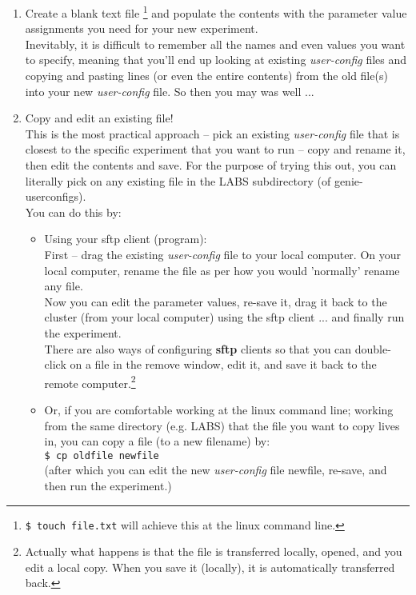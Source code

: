\begin{enumerate}[noitemsep]

\vspace{1mm}
\item Create a blank text file \footnote{\texttt{\$ touch file.txt} will achieve this at the linux command line.} and populate the contents with the parameter value assignments you need for your new experiment.
\\Inevitably, it is difficult to remember all the names and even values you want to specify, meaning that you'll end up looking at existing \textit{user-config} files and copying and pasting lines (or even the entire contents) from the old file(s) into your new \textit{user-config} file. So then you may was well ...

\vspace{1mm}
\item Copy and edit an existing file!
\\This is the most practical approach -- pick an existing \textit{user-config} file that is closest to the specific experiment that you want to run -- copy and rename it, then edit the contents and save. For the purpose of trying this out, you can literally pick on any existing file in the \textsf{\footnotesize LABS } subdirectory (of \textsf{\footnotesize genie-userconfigs}).
\vspace{1mm}
\\ You can do this by:
\begin{itemize}[noitemsep]
\vspace{1mm}
\item Using your sftp client (program):
\\First -- drag the existing \textit{user-config} file to your local computer. On your local computer, rename the file as per how you would 'normally' rename any file. 
\\Now you can edit the parameter values, re-save it, drag it back to the cluster (from your local computer) using the sftp client ... and finally run the experiment.
\\There are also ways of configuring \textbf{sftp} clients so that you can double-click on a file in the remove window, edit it, and save it back to the remote computer.\footnote{Actually what happens is that the file is transferred locally, opened, and you edit a local copy. When you save it (locally), it is automatically transferred back.} 
\vspace{1mm}
\item Or, if you are comfortable working at the linux command line; working from the same directory (e.g. \textsf{\footnotesize LABS}) that the file you want to copy lives in, you can copy a file (to a new filename) by:
\\\texttt{\$ cp oldfile newfile }
\\(after which you can edit the new \textit{user-config} file \textsf{\footnotesize newfile}, re-save, and then run the experiment.)
\end{itemize}
\vspace{1mm}

\end{enumerate}

